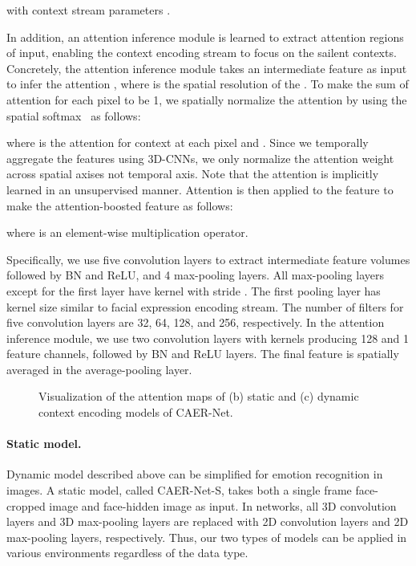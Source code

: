 \documentclass[10pt,twocolumn,letterpaper]{article}
\begin{document}
with context stream parameters .

In addition, an attention inference module is learned to extract attention regions of input, enabling the context encoding stream to focus on the sailent contexts.
Concretely, the attention inference module takes an intermediate feature  as input to infer the attention , where  is the spatial resolution of the .
To make the sum of attention for each pixel to be 1, we spatially normalize the attention  by using the spatial softmax~\cite{sharma2015action} as follows:

where  is the attention for context at each pixel  and .
Since we temporally aggregate the features using 3D-CNNs, we only normalize the attention weight across spatial axises not temporal axis.
Note that the attention is implicitly learned in an unsupervised manner.
Attention  is then applied to the feature  to make the attention-boosted feature  as follows:

where  is an element-wise multiplication operator.

Specifically, we use five convolution layers to extract intermediate feature volumes  followed by BN and ReLU, and 4 max-pooling layers.
All max-pooling layers except for the first layer have  kernel with stride .
The first pooling layer has kernel size  similar to facial expression encoding stream.
The number of filters for five convolution layers are 32, 64, 128, and 256, respectively.
In the attention inference module, we use two convolution layers with  kernels producing 128 and 1 feature channels, followed by BN and ReLU layers.
The final feature  is spatially averaged in the average-pooling layer.\vspace{-10pt}

\begin{figure}
	\centering
	\renewcommand{\thesubfigure}{}
	\hfill
	\hfill
	\hfill
	\caption{Visualization of the attention maps of (b) static and (c) dynamic context encoding models of CAER-Net.}
	\label{fig:3}\vspace{-10pt}
\end{figure}

\paragraph{Static model.}
Dynamic model described above can be simplified for emotion recognition in images. A static model, called CAER-Net-S, takes both a single frame face-cropped image  and face-hidden image  as input.
In networks, all 3D convolution layers and 3D max-pooling layers are replaced with 2D convolution layers and 2D max-pooling layers, respectively.
Thus, our two types of models can be applied in various environments regardless of the data type.
\end{document}
